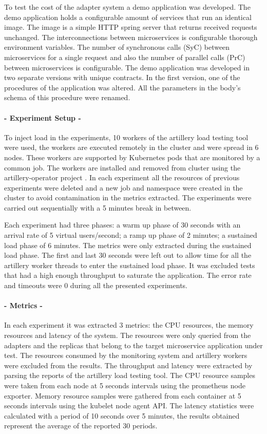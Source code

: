 To test the cost of the adapter system a demo application was developed.
The demo application holds a configurable amount of services that run an identical image.
The image is a simple HTTP spring server that returns received requests unchanged.
The interconnections between microservices is configurable thorough environment variables.
The number of synchronous calls (SyC) between microservices for a single request and also the number of parallel calls (PrC) between microservices is configurable.
The demo application was developed in two separate versions with unique contracts.
In the first version, one of the procedures of the application was altered.
All the parameters in the body's schema of this procedure were renamed.

\paragraph{- Experiment Setup -}

To inject load in the experiments, 10 workers of the artillery load testing tool were used,
the workers are executed remotely in the cluster and were spread in 6 nodes.
These workers are supported by Kubernetes pods that are monitored by a common job.
The workers are installed and removed from cluster using the artillery-operator project \cite{artilleryoperator}.
In each experiment all the resources of previous experiments were deleted and a new job and namespace were created in the
cluster to avoid contamination in the metrics extracted.
The experiments were carried out sequentially with a 5 minutes break in between.

Each experiment had three phases:
a warm up phase of 30 seconds with an arrival rate of 5 virtual users/second;
a ramp up phase of 2 minutes;
a sustained load phase of 6 minutes.
The metrics were only extracted during the sustained load phase.
The first and last 30 seconds were left out to allow time for all the artillery worker threads to enter the sustained load phase.
It was excluded tests that had a high enough throughput to saturate the application.
The error rate and timeouts were 0 during all the presented experiments.

\paragraph{- Metrics -}

In each experiment it was extracted 3 metrics: the CPU resources, the memory resources and latency of the system.
The resources were only queried from the adapters and the replicas that belong to the target microservice application under test.
The resources consumed by the monitoring system and artillery workers were excluded from the results.
The throughput and latency were extracted by parsing the reports of the artillery load testing tool.
The CPU resource samples were taken from each node at 5 seconds intervals using the prometheus node exporter.
Memory resource samples were gathered from each container at 5 seconds intervals using the kubelet node agent API.
The latency statistics were calculated with a period of 10 seconds over 5 minutes, the results obtained represent the
average of the reported 30 periods.


